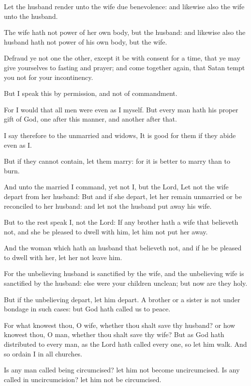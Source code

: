 \Verse Let the husband render unto the wife due benevolence: and likewise also the wife unto the husband.

\Verse The wife hath not power of her own body, but the husband: and likewise also the husband hath not power of his own body, but the wife.

\Verse Defraud ye not one the other, except it be with consent for a time, that ye may give yourselves to fasting and prayer; and come together again, that Satan tempt you not for your incontinency.

\Verse But I speak this by permission, and not of commandment.

\Verse For I would that all men were even as I myself. But every man hath his proper gift of God, one after this manner, and another after that.

\Verse I say therefore to the unmarried and widows, It is good for them if they abide even as I.

\Verse But if they cannot contain, let them marry: for it is better to marry than to burn.

\Verse And unto the married I command, yet not I, but the Lord, Let not the wife depart from her husband: \Verse But and if she depart, let her remain unmarried or be reconciled to her husband: and let not the husband put away his wife.

\Verse But to the rest speak I, not the Lord: If any brother hath a wife that believeth not, and she be pleased to dwell with him, let him not put her away.

\Verse And the woman which hath an husband that believeth not, and if he be pleased to dwell with her, let her not leave him.

\Verse For the unbelieving husband is sanctified by the wife, and the unbelieving wife is sanctified by the husband: else were your children unclean; but now are they holy.

\Verse But if the unbelieving depart, let him depart. A brother or a sister is not under bondage in such cases: but God hath called us to peace.

\Verse For what knowest thou, O wife, whether thou shalt save thy husband?  or how knowest thou, O man, whether thou shalt save thy wife?  \Verse But as God hath distributed to every man, as the Lord hath called every one, so let him walk. And so ordain I in all churches.

\Verse Is any man called being circumcised? let him not become uncircumcised. Is any called in uncircumcision? let him not be circumcised.

